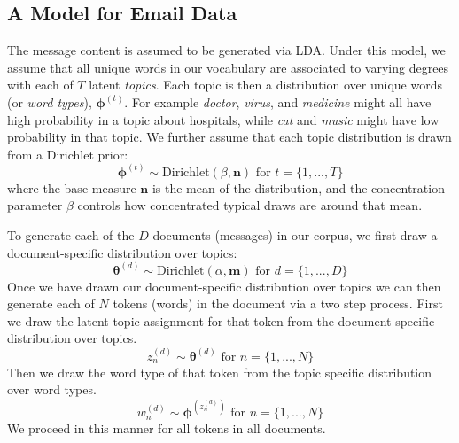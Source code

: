 \documentclass{pnastwo}
\begin{document}
\begin{article}
	
\section{A Model for Email Data}

The message content is assumed to be generated via LDA. Under this model, we assume that all unique words in our vocabulary are associated to varying degrees with each of $T$ latent \emph{topics}. Each topic is then a distribution over unique words (or \emph{word types}), $\boldsymbol{\phi}^{(t)}$. For example \emph{doctor}, \emph{virus}, and \emph{medicine} might all have high probability in a topic about hospitals, while \emph{cat} and \emph{music} might have low probability in that topic. We further assume that each topic distribution is drawn from a Dirichlet prior: 
\begin{equation}
	\boldsymbol{\phi}^{(t)} \sim \text{Dirichlet}(\beta,\boldsymbol{n}) \text{ for } t = \{1, ..., T\}
\end{equation}
where the base measure $\boldsymbol{n}$ is the mean of the distribution, and the concentration parameter $\beta$ controls how concentrated typical draws are around that mean. 

To generate each of the $D$ documents (messages) in our corpus, we first draw a document-specific distribution over topics:
\begin{equation}
	\boldsymbol{\theta}^{(d)} \sim \text{Dirichlet}(\alpha,\boldsymbol{m}) \text{ for } d = \{1,...,D\}
\end{equation}
Once we have drawn our document-specific distribution over topics we can then generate each of $N$ tokens (words) in the document via a two step process. First we draw the latent topic assignment for that token from the document specific distribution over topics.
\begin{equation}
	z_n^{(d)} \sim \boldsymbol{\theta}^{(d)} \text{ for } n = \{1,...,N\}
\end{equation}
 Then we draw the word type of that token from the topic specific distribution over word types.
 \begin{equation}
 	w_n^{(d)} \sim \boldsymbol{\phi}^{(z_n^{(d)})} \text{ for } n = \{1,...,N\}
 \end{equation}
We proceed in this manner for all tokens in all documents. 



\end{article}
\end{document}
